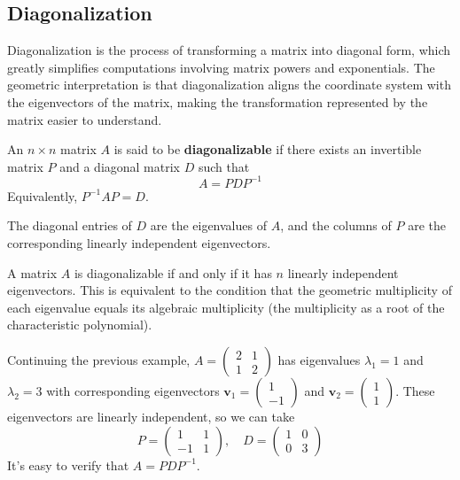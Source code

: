 \subsection{Diagonalization}

Diagonalization is the process of transforming a matrix into diagonal form, which greatly simplifies computations involving matrix powers and exponentials. The geometric interpretation is that diagonalization aligns the coordinate system with the eigenvectors of the matrix, making the transformation represented by the matrix easier to understand.

\begin{definition}
An $n \times n$ matrix $A$ is said to be \textbf{diagonalizable} if there exists an invertible matrix $P$ and a diagonal matrix $D$ such that
\[
A = PDP^{-1}
\]
Equivalently, $P^{-1}AP = D$.
\end{definition}

The diagonal entries of $D$ are the eigenvalues of $A$, and the columns of $P$ are the corresponding linearly independent eigenvectors.

\begin{theorem}
A matrix $A$ is diagonalizable if and only if it has $n$ linearly independent eigenvectors. This is equivalent to the condition that the geometric multiplicity of each eigenvalue equals its algebraic multiplicity (the multiplicity as a root of the characteristic polynomial).
\end{theorem}

\begin{example}
Continuing the previous example, $A = \begin{pmatrix} 2 & 1 \\ 1 & 2 \end{pmatrix}$ has eigenvalues $\lambda_1=1$ and $\lambda_2=3$ with corresponding eigenvectors $\mathbf{v}_1 = \begin{pmatrix} 1 \\ -1 \end{pmatrix}$ and $\mathbf{v}_2 = \begin{pmatrix} 1 \\ 1 \end{pmatrix}$. These eigenvectors are linearly independent, so we can take
\[
P = \begin{pmatrix} 1 & 1 \\ -1 & 1 \end{pmatrix}, \quad D = \begin{pmatrix} 1 & 0 \\ 0 & 3 \end{pmatrix}
\]
It's easy to verify that $A = PDP^{-1}$.
\end{example}


